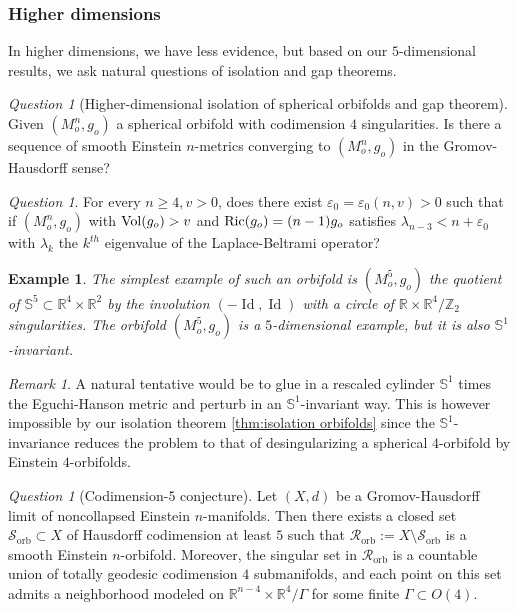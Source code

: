 \documentclass[11pt,reqno]{amsart}
\numberwithin{equation}{section}
\newcommand{\Ric}{{\rm Ric}}
\newcommand{\Vol}{{\rm Vol}}
\newtheorem{exmp}[thm]{Example}
\theoremstyle{definition}
\theoremstyle{remark}
\newtheorem{remark}[thm]{Remark}
\newtheorem{question}[thm]{Question}
\begin{document}
\subsubsection{Higher dimensions}

In higher dimensions, we have less evidence, but based on our $5$-dimensional results, we ask natural questions of isolation and gap theorems. 

\begin{question}[Higher-dimensional isolation of spherical orbifolds and gap theorem]
    Given $(M_o^n,g_o)$ a spherical orbifold with codimension $4$ singularities. Is there a sequence of smooth Einstein $n$-metrics converging to $(M_o^n,g_o)$ in the Gromov-Hausdorff sense? 
\end{question}

\begin{question}\label{ques: gap higher dime}
    For every $n \ge 4, v>0$, does there exist $\varepsilon_0 = \varepsilon_0(n,v)>0$ such that if $(M_o^n,g_o)$ with $\Vol(g_o)>v$ and $\Ric(g_o) = (n-1)g_o$ satisfies $\lambda_{n-3}<n+\varepsilon_0$ with $\lambda_{k}$ the $k^{th}$ eigenvalue of the Laplace-Beltrami operator?
\end{question}

\begin{exmp}
    The simplest example of such an orbifold is $(M_o^5,g_o)$ the quotient of $\mathbb{S}^5\subset \mathbb{R}^4\times \mathbb{R}^2$ by the involution $(-\operatorname{Id},\operatorname{Id})$ with a circle of $\mathbb{R}\times\mathbb{R}^4/\mathbb{Z}_2$ singularities. The orbifold $(M_o^5,g_o)$ is a $5$-dimensional example, but it is also $\mathbb{S}^1$-invariant. 
\end{exmp}


\begin{remark}
    A natural tentative would be to glue in a rescaled cylinder $\mathbb{S}^1$ times the Eguchi-Hanson metric and perturb in an $\mathbb{S}^1$-invariant way. This is however impossible by our isolation theorem \ref{thm:isolation orbifolds} since the $\mathbb{S}^1$-invariance reduces the problem to that of desingularizing a spherical $4$-orbifold by Einstein $4$-orbifolds.
\end{remark}


\begin{question}[Codimension-$5$ conjecture]\label{ques:codim 5}
Let $(X,d)$ be a Gromov-Hausdorff limit of noncollapsed Einstein $n$-manifolds. Then there exists a closed set $\mathcal{S}_{\mathrm{orb}}\subset X$ of Hausdorff codimension at least $5$ such that $\mathcal{R}_{\mathrm{orb}}:=X\setminus\mathcal{S}_{\mathrm{orb}}$ is a smooth Einstein $n$-orbifold. Moreover, the singular set in $\mathcal{R}_{\mathrm{orb}}$ is a countable union of totally geodesic codimension $4$ submanifolds, and each point on this set admits a neighborhood modeled on
$\mathbb{R}^{n-4}\times \mathbb{R}^4/\Gamma$ for some finite $\Gamma\subset O(4)$.
\end{question}
\end{document}
